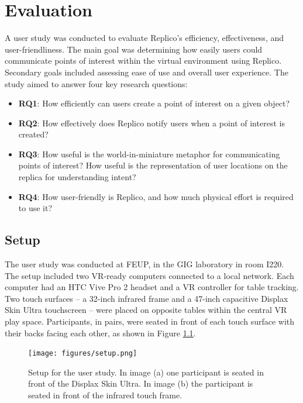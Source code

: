 \chapter{Evaluation}\label{chap:eval}

A user study was conducted to evaluate Replico's efficiency, effectiveness, and user-friendliness. The main goal was determining how easily users could communicate points of interest within the virtual environment using Replico. Secondary goals included assessing ease of use and overall user experience. The study aimed to answer four key research questions:

\begin{itemize}
    \item \textbf{RQ1}: How efficiently can users create a point of interest on a given object?
    \item \textbf{RQ2}: How effectively does Replico notify users when a point of interest is created?
    \item \textbf{RQ3}: How useful is the world-in-miniature metaphor for communicating points of interest? How useful is the representation of user locations on the replica for understanding intent? %
    \item \textbf{RQ4}: How user-friendly is Replico, and how much physical effort is required to use it? 
\end{itemize}

\section{Setup}


    The user study was conducted at FEUP, in the GIG laboratory in room I220. The setup included two VR-ready computers connected to a local network. Each computer had an HTC Vive Pro 2 headset and a VR controller for table tracking. Two touch surfaces -- a 32-inch infrared frame and a 47-inch capacitive Displax Skin Ultra touchscreen -- were placed on opposite tables within the central VR play space. Participants, in pairs, were seated in front of each touch surface with their backs facing each other, as shown in Figure \ref{fig:eval_setup}.

    \begin{figure}[h]
        \centering
        \texttt{[image: figures/setup.png]}
        \caption{Setup for the user study. In image (a) one participant is seated in front of the Displax Skin Ultra. In image (b) the participant is seated in front of the infrared touch frame.}
        \label{fig:eval_setup}
    \end{figure}

